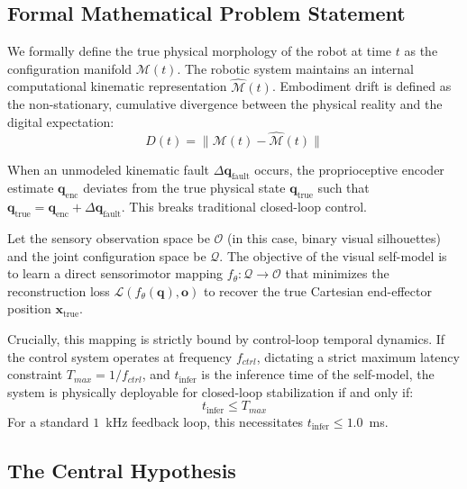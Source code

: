 \documentclass[12pt,a4paper,oneside]{report}
\begin{document}
\subsection{Formal Mathematical Problem Statement}
\label{subsec:formal_mathematical_problem_statement_intro}

We formally define the true physical morphology of the robot at time $t$ as the configuration manifold $\mathcal{M}(t)$. The robotic system maintains an internal computational kinematic representation $\hat{\mathcal{M}}(t)$. Embodiment drift is defined as the non-stationary, cumulative divergence between the physical reality and the digital expectation:
\begin{equation}
D(t) = \|\mathcal{M}(t) - \hat{\mathcal{M}}(t)\|
\end{equation}

When an unmodeled kinematic fault $\Delta \mathbf{q}_{\text{fault}}$ occurs, the proprioceptive encoder estimate $\mathbf{q}_{\text{enc}}$ deviates from the true physical state $\mathbf{q}_{\text{true}}$ such that $\mathbf{q}_{\text{true}} = \mathbf{q}_{\text{enc}} + \Delta \mathbf{q}_{\text{fault}}$. This breaks traditional closed-loop control.

Let the sensory observation space be $\mathcal{O}$ (in this case, binary visual silhouettes) and the joint configuration space be $\mathcal{Q}$. The objective of the visual self-model is to learn a direct sensorimotor mapping $f_\theta: \mathcal{Q} \rightarrow \mathcal{O}$ that minimizes the reconstruction loss $\mathcal{L}(f_\theta(\mathbf{q}), \mathbf{o})$ to recover the true Cartesian end-effector position $\mathbf{x}_{\text{true}}$.

Crucially, this mapping is strictly bound by control-loop temporal dynamics. If the control system operates at frequency $f_{ctrl}$, dictating a strict maximum latency constraint $T_{max} = 1/f_{ctrl}$, and $t_{\text{infer}}$ is the inference time of the self-model, the system is physically deployable for closed-loop stabilization if and only if:
\begin{equation}
t_{\text{infer}} \le T_{max}
\end{equation}
For a standard $1$~kHz feedback loop, this necessitates $t_{\text{infer}} \le 1.0$~ms.

\subsection{The Central Hypothesis}
\label{subsec:central_hypothesis_intro}
\end{document}
